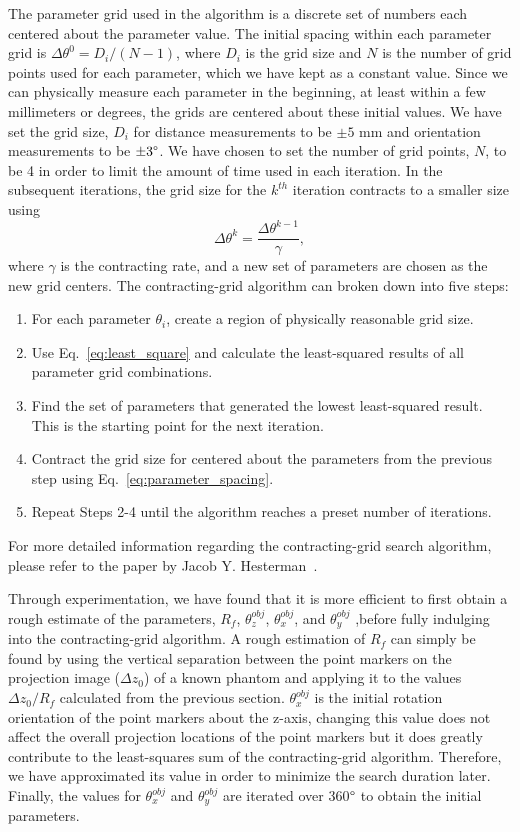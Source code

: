 The parameter grid used in the algorithm is a discrete set of numbers each centered about the parameter value.  The initial spacing within each parameter grid is $\Delta \theta^0 = D_i/(N-1)$, where $D_i$ is the grid size and $N$ is the number of grid points used for each parameter, which we have kept as a constant value.  Since we can physically measure each parameter in the beginning, at least within a few millimeters or degrees, the grids are centered about these initial values.  We have set the grid size, $D_i$ for distance measurements to be $\pm 5$ mm and orientation measurements to be $\pm 3 \degree$.  We have chosen to set the number of grid points, $N$, to be 4 in order to limit the amount of time used in each iteration.  In the subsequent iterations, the grid size for the $k^{th}$ iteration contracts to a smaller size using
%
\begin{equation}
\label{eq:parameter_spacing}
\Delta \theta^k = \frac{\Delta \theta^{k-1}}{\gamma},
\end{equation}
%
where $\gamma$ is the contracting rate, and a new set of parameters are chosen as the new grid centers.  The contracting-grid algorithm can broken down into five steps:
%
\begin{enumerate}
\item For each parameter $\theta_i$, create a region of physically reasonable grid size.
\item Use Eq.~\ref{eq:least_square} and calculate the least-squared results of all parameter grid combinations.
\item Find the set of parameters that generated the lowest least-squared result.  This is the starting point for the next iteration.
\item Contract the grid size for centered about the parameters from the previous step using Eq.~\ref{eq:parameter_spacing}.
\item Repeat Steps 2-4 until the algorithm reaches a preset number of iterations.
\end{enumerate}
For more detailed information regarding the contracting-grid search algorithm, please refer to the paper by Jacob Y. Hesterman~\citep{Hesterman2010}.  

Through experimentation, we have found that it is more efficient to first obtain a rough estimate of the parameters, $R_f$, $\theta^{obj}_z$, $\theta^{obj}_x$, and $\theta^{obj}_y$ ,before fully indulging into the contracting-grid algorithm.  A rough estimation of $R_f$ can simply be found by using the vertical separation between the point markers on the projection image ($\Delta z_0$) of a known phantom and applying it to the values $\Delta z_0/R_f$ calculated from the previous section.  $\theta^{obj}_x$ is the initial rotation orientation of the point markers about the z-axis, changing this value does not affect the overall projection locations of the point markers but it does greatly contribute to the least-squares sum of the contracting-grid algorithm.  Therefore, we have approximated its value in order to minimize the search duration later.  Finally, the values for $\theta_x^{obj}$ and $\theta_y^{obj}$ are iterated over 360$\degree$ to obtain the initial parameters.

